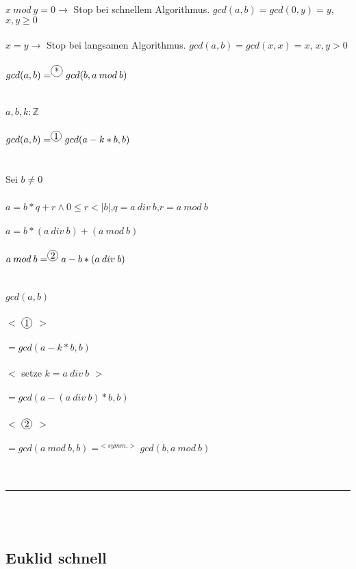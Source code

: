 \documentclass[18pt,a4paper]{article}
\newcommand*\circled[1]{\tikz[baseline=(char.base)]{
            \node[shape=circle,draw,inner sep=1pt] (char) {#1};}}
\newcommand{\tab}{\hspace*{2em}}
\begin{document}
$x \: mod \: y =0 \rightarrow$ Stop bei schnellem Algorithmus. $gcd(a,b) = gcd(0,y) = y$,\tab $x,y\geqslant0$\\
\\
$x=y \rightarrow$ Stop bei langsamen Algorithmus. $gcd(a,b) = gcd(x,x) = x$, \tab$x,y>0$\\
\\
$gcd(a,b) =^{\circled{*}} gcd(b, a\: mod\: b)$\\
\\
\\
$a,b,k : \mathbb{Z}$\\
\\
$gcd(a,b) =^{\circled{1}} gcd(a-k*b, b)$\\
\\
\\
Sei $b\neq0$\\
\\
$a = b* q + r \wedge 0 \leqslant r < |b|$,\tab $q = a\: div \:b$,\tab $r = a\: mod\: b$\\
\\
$a = b*(a\: div \:b) + (a\: mod\: b)$\\
\\
$a\: mod\: b =^{\circled{2}} a - b*(a\: div\: b)$\\
\\
\\
$gcd(a,b)$\\
\\
\tab $<$ $\circled{1}$ $>$\\
\\
$= gcd(a-k*b,b)$\\
\\
\tab $<$ setze $k = a\: div\: b$ $>$\\
\\
$= gcd(a-(a\: div\: b)*b,b)$\\
\\
\tab $<$ $\circled{2}$ $>$\\
\\
$= gcd(a\: mod\: b, b) =^{<symm.>} gcd(b, a\: mod\: b)$\\
\\
\\
\rule{\textwidth}{0.4mm}\\
\\

\subsection{Euklid schnell}
\end{document}
